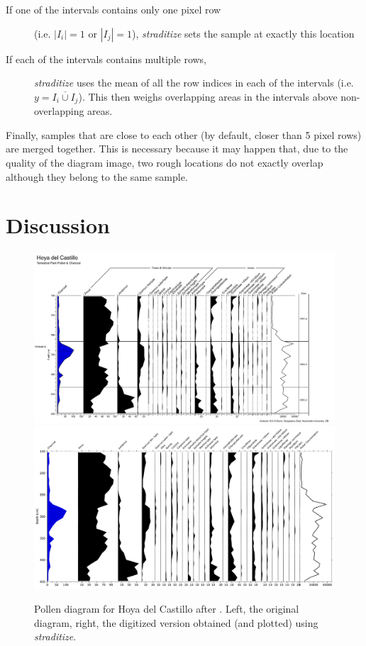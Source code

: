 \documentclass[
11pt, %
english, %
singlespacing, %
headsepline, %
]{MastersDoctoralThesis} %
\begin{document}
\begin{NoHyper}
\begin{refsection}
\begin{description}
	\item[If one of the intervals contains only one pixel row] (i.e. $\left| I_i \right| = 1$ or $\left| I_j \right| = 1$), \emph{straditize} sets the sample at exactly this location
	\item[If each of the intervals contains multiple rows,] \emph{straditize} uses the mean of all the row indices in each of the intervals (i.e. $y = \overline{I_i \cup I_j}$). This then weighs overlapping areas in the intervals above non-overlapping areas.
\end{description}

Finally, samples that are close to each other (by default, closer than 5 pixel rows) are merged together. This is necessary because it may happen that, due to the quality of the diagram image, two rough locations do not exactly overlap although they belong to the same sample.


\setcounter{secnumdepth}{2}
\endgroup

\section{Discussion}  \label{sec:straditize-discussion}

\begin{figure}
	\centering
	\includegraphics[width=0.45\linewidth]{straditize-figures/hoya-del-castillo.pdf}
	\includegraphics[width=0.45\linewidth]{straditize-figures/hoya-del-castillo-digitized.pdf}
	\caption[Pollen diagram for Hoya del Castillo]{Pollen diagram for Hoya del Castillo after \cite{DavisStevenson2007}. Left,  the original diagram, right, the digitized version obtained (and plotted) using \emph{straditize}.}
	\label{fig:hoya-del-castillo}
\end{figure}


\end{refsection}
\end{NoHyper}
\end{document}

